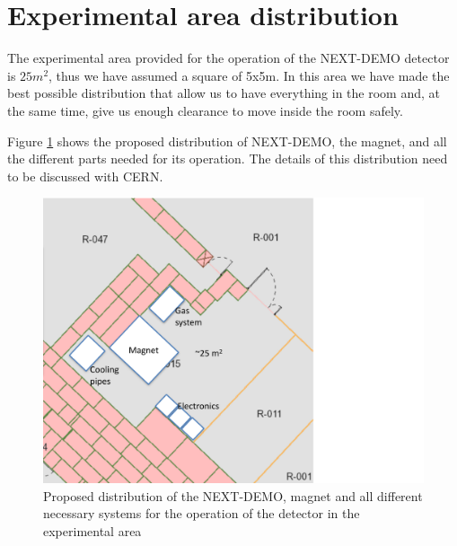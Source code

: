 
\section{Experimental area distribution}

The experimental area provided for the operation of the NEXT-DEMO detector is $25m^2$, thus we have assumed a square of 5x5m. In this area we have made the best possible distribution that allow us to have everything in the room and, at the same time, give us enough clearance to move inside the room safely.

Figure \ref{fig:Distribution} shows the proposed distribution of NEXT-DEMO, the magnet, and all the different parts needed for its operation. The details of this distribution need to be discussed with CERN.

\begin{figure}
\centering
\includegraphics[angle=90,width=\textwidth]{img/distribution_examples.pdf}
\caption{Proposed distribution of the NEXT-DEMO, magnet and all different necessary systems for the operation of the detector in the experimental area} \label{fig:Distribution}
\end{figure}

